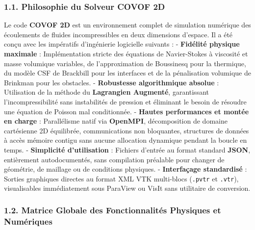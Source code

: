 \documentclass[
  french,
]{article}
\begin{document}
\subsubsection{1.1. Philosophie du Solveur COVOF
2D}\label{philosophie-du-solveur-covof-2d}

Le code \textbf{COVOF 2D} est un environnement complet de simulation
numérique des écoulements de fluides incompressibles en deux dimensions
d'espace. Il a été conçu avec les impératifs d'ingénierie logicielle
suivants : - \textbf{Fidélité physique maximale} : Implémentation
stricte des équations de Navier-Stokes à viscosité et masse volumique
variables, de l'approximation de Boussinesq pour la thermique, du modèle
CSF de Brackbill pour les interfaces et de la pénalisation volumique de
Brinkman pour les obstacles. - \textbf{Robustesse algorithmique absolue}
: Utilisation de la méthode du \textbf{Lagrangien Augmenté},
garantissant l'incompressibilité sans instabilités de pression et
éliminant le besoin de résoudre une équation de Poisson mal
conditionnée. - \textbf{Hautes performances et montée en charge} :
Parallélisme natif via \textbf{OpenMPI}, décomposition de domaine
cartésienne 2D équilibrée, communications non bloquantes, structures de
données à accès mémoire contigu sans aucune allocation dynamique pendant
la boucle en temps. - \textbf{Simplicité d'utilisation} : Fichiers
d'entrée au format standard \textbf{JSON}, entièrement autodocumentés,
sans compilation préalable pour changer de géométrie, de maillage ou de
conditions physiques. - \textbf{Interfaçage standardisé} : Sorties
graphiques directes au format XML VTK multi-blocs (\texttt{.pvtr} et
\texttt{.vtr}), visualisables immédiatement sous ParaView ou VisIt sans
utilitaire de conversion.

\subsubsection{1.2. Matrice Globale des Fonctionnalités Physiques et
Numériques}\label{matrice-globale-des-fonctionnalituxe9s-physiques-et-numuxe9riques}
\end{document}
